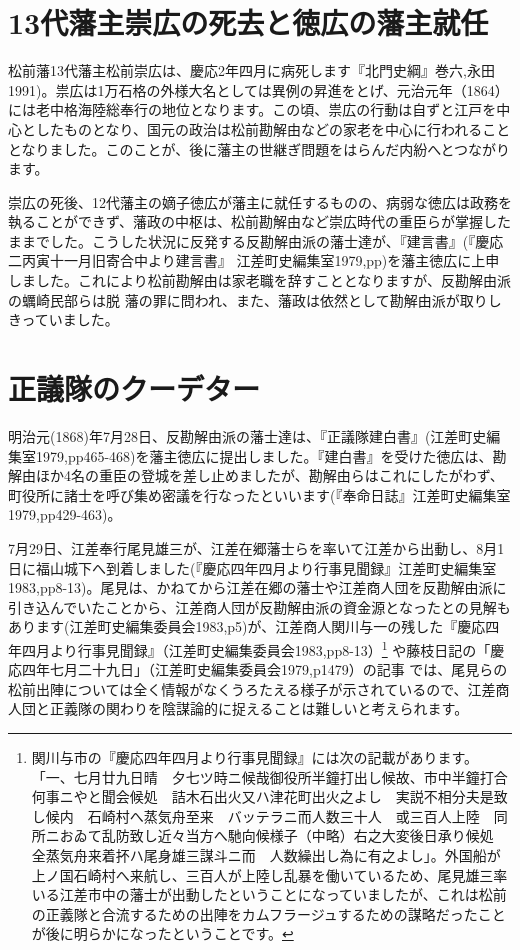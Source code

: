 \documentclass[11pt,report]{jsbook}
\begin{document}
\section{13代藩主崇広の死去と徳広の藩主就任}
松前藩13代藩主松前崇広は、慶応2年四月に病死します『北門史綱』巻六,永田1991)。祟広は1万石格の外様大名としては異例の昇進をとげ、元治元年（1864）には老中格海陸総奉行の地位となります。この頃、祟広の行動は自ずと江戸を中心としたものとなり、国元の政治は松前勘解由などの家老を中心に行われることとなりました。このことが、後に藩主の世継ぎ問題をはらんだ内紛へとつながります。

崇広の死後、12代藩主の嫡子徳広が藩主に就任するものの、病弱な徳広は政務を執ることができず、藩政の中枢は、松前勘解由など崇広時代の重臣らが掌握したままでした。こうした状況に反発する反勘解由派の藩士達が、『建言書』(『慶応二丙寅十一月旧寄合中より建言書』 江差町史編集室1979,pp)を藩主徳広に上申しました。これにより松前勘解由は家老職を辞すこととなりますが、反勘解由派の蠣崎民部らは脱
藩の罪に問われ、また、藩政は依然として勘解由派が取りしきっていました。

\section{正議隊のクーデター}
明治元(1868)年7月28日、反勘解由派の藩士達は、『正議隊建白書』(江差町史編集室1979,pp465-468)を藩主徳広に提出しました。『建白書』を受けた徳広は、勘解由ほか4名の重臣の登城を差し止めましたが、勘解由らはこれにしたがわず、町役所に諸士を呼び集め密議を行なったといいます(『奉命日誌』江差町史編集室1979,pp429-463)。

7月29日、江差奉行尾見雄三が、江差在郷藩士らを率いて江差から出動し、8月1日に福山城下へ到着しました(『慶応四年四月より行事見聞録』江差町史編集室1983,pp8-13)。尾見は、かねてから江差在郷の藩士や江差商人団を反勘解由派に引き込んでいたことから、江差商人団が反勘解由派の資金源となったとの見解もあります(江差町史編集委員会1983,p5)が、江差商人関川与一の残した『慶応四年四月より行事見聞録』（江差町史編集委員会1983,pp8-13）\footnote{
関川与市の『慶応四年四月より行事見聞録』には次の記載があります。「一、七月廿九日晴　夕七ツ時ニ候哉御役所半鐘打出し候故、市中半鐘打合　何事ニやと聞会候処　詰木石出火又ハ津花町出火之よし　実説不相分夫是致し候内　石崎村へ蒸気舟至来　バッテラニ而人数三十人　或三百人上陸　同所ニおゐて乱防致し近々当方へ馳向候様子（中略）右之大変後日承り候処　全蒸気舟来着抔ハ尾身雄三謀斗ニ而　人数繰出し為に有之よし」。外国船が上ノ国石崎村へ来航し、三百人が上陸し乱暴を働いているため、尾見雄三率いる江差市中の藩士が出動したということになっていましたが、これは松前の正義隊と合流するための出陣をカムフラージュするための謀略だったことが後に明らかになったということです。
}
や藤枝日記の「慶応四年七月二十九日」（江差町史編集委員会1979,p1479）の記事
では、尾見らの松前出陣については全く情報がなくうろたえる様子が示されているので、江差商人団と正義隊の関わりを陰謀論的に捉えることは難しいと考えられます。
\end{document}
